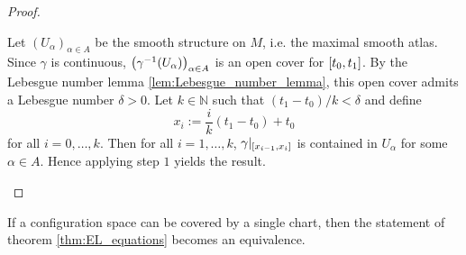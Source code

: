 \begin{proof}
\begin{enumerate}[label = \textit{Step \arabic*:},wide=0pt]
			Let $(U_\alpha)_{\alpha \in A}$ be the smooth structure on $M$, i.e. the maximal smooth atlas. Since $\gamma$ is continuous, $\del[1]{\gamma^{-1}(U_\alpha)}_{\alpha \in A}$ is an open cover for $\intcc[0]{t_0,t_1}$. By the Lebesgue number lemma \ref{lem:Lebesgue_number_lemma}, this open cover admits a Lebesgue number $\delta > 0$. Let $k \in \mathbb{N}$ such that $(t_1 - t_0)/k < \delta$ and define
			\begin{equation*}
				x_i := \frac{i}{k}(t_1 - t_0) + t_0
			\end{equation*}
			\noindent for all $i = 0,\dots,k$. Then for all $i = 1,\dots,k$, $\gamma\vert_{\intcc[0]{x_{i - 1},x_i}}$ is contained in $U_\alpha$ for some $\alpha \in A$. Hence applying step $1$ yields the result.
	\end{enumerate}
\end{proof}

\begin{remark}
	\label{rem:global_chart}
	If a configuration space can be covered by a single chart, then the statement of theorem \ref{thm:EL_equations} becomes an equivalence.
\end{remark}

